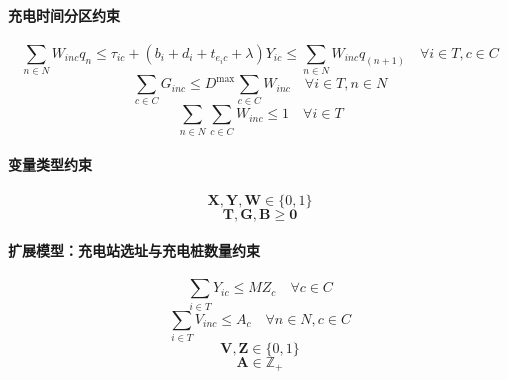 \documentclass[11pt]{ctexart}
\begin{document}
\paragraph{充电时间分区约束}
\begin{equation}
\sum_{n \in N} W_{inc} q_n \le \tau_{ic} + (b_i + d_i + t_{e_i c} + \lambda) Y_{ic} \le \sum_{n \in N} W_{inc} q_{(n+1)} \quad \forall i \in T, c \in C \tag{13}
\end{equation}
\begin{equation}
\sum_{c \in C} G_{inc} \le D^{\max} \sum_{c \in C} W_{inc} \quad \forall i \in T, n \in N \tag{14}
\end{equation}
\begin{equation}
\sum_{n \in N} \sum_{c \in C} W_{inc} \le 1 \quad \forall i \in T \tag{15}
\end{equation}
\paragraph{变量类型约束}
\begin{equation}
\boldsymbol{X}, \boldsymbol{Y}, \boldsymbol{W} \in \{0, 1\} \tag{16}
\end{equation}
\begin{equation}
\boldsymbol{T}, \boldsymbol{G}, \boldsymbol{B} \ge \boldsymbol{0} \tag{17}
\end{equation}
\paragraph{扩展模型：充电站选址与充电桩数量约束}
\begin{equation}
\sum_{i \in T} Y_{ic} \le M Z_c \quad \forall c \in C \tag{19}
\end{equation}
\begin{equation}
\sum_{i \in T} V_{inc} \le A_c \quad \forall n \in N, c \in C \tag{21}
\end{equation}
\begin{equation}
\boldsymbol{V}, \boldsymbol{Z} \in \{0, 1\} \tag{22}
\end{equation}
\begin{equation}
\boldsymbol{A}\in\mathbb Z_+ \tag{23}
\end{equation}
\end{document}
